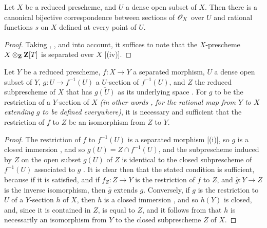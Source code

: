 \begin{cor}[7.2.6]
\label{1.7.2.6}
Let $X$ be a reduced prescheme, and $U$ a dense open subset of $X$.
Then there is a canonical bijective correspondence between sections of $\mathscr{O}_X$ over $U$ and rational functions $s$ on $X$ defined at every point of $U$.
\end{cor}

\begin{proof}
\label{proof-1.7.2.6}
Taking , , and  into account, it suffices to note that the $X$-prescheme $X\otimes_{\mathbf{Z}}\mathbf{Z}[T]$ is separated over $X$ [(iv)].
\end{proof}

\begin{cor}[7.2.7]
\label{1.7.2.7}
Let $Y$ be a reduced prescheme, $f\colon X\to Y$ a separated morphism, $U$ a dense open subset of $Y$, $g\colon U\to f^{-1}(U)$ a $U$-section of $f^{-1}(U)$, and $Z$ the reduced subprescheme of $X$ that has $\overline{g(U)}$ as its underlying space .
For $g$ to be the restriction of a $Y$-section of $X$ \emph{(in other words , for the rational map from $Y$ to $X$ extending $g$ to be defined everywhere)}, it is necessary and sufficient that the restriction of $f$ to $Z$ be an isomorphism from $Z$ to $Y$.
\end{cor}

\begin{proof}
\label{proof-1.7.2.7}
The restriction of $f$ to $f^{-1}(U)$ is a separated morphism [(i)], so $g$ is a closed immersion , and so $g(U)=Z\cap f^{-1}(U)$, and the subprescheme induced by $Z$ on the open subset $g(U)$ of $Z$ is identical to the closed subprescheme of $f^{-1}(U)$ associated to $g$ .
It is clear then that the stated condition is sufficient, because if it is satisfied, and if $f_Z\colon Z\to Y$ is the restriction of $f$ to $Z$, and $\overline{g}\colon Y\to Z$ is the inverse isomorphism, then $\overline{g}$ extends $g$.
Conversely, if $g$ is the restriction to $U$ of a $Y$-section $h$ of $X$, then $h$ is a closed immersion , and so $h(Y)$ is closed, and, since it is contained in $Z$, is equal to $Z$, and it follows from  that $h$ is necessarily an isomorphism from $Y$ to the closed subprescheme $Z$ of $X$.
\end{proof}

